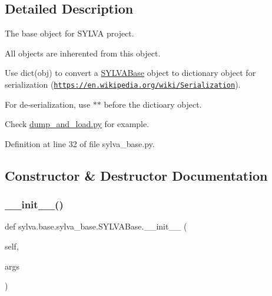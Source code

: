 \subsection{Detailed Description}
The base object for S\+Y\+L\+VA project. 

All objects are inherented from this object.


\begin{DoxyItemize}
\item Use {\ttfamily dict(obj)} to convert a \hyperlink{classsylva_1_1base_1_1sylva__base_1_1_s_y_l_v_a_base}{S\+Y\+L\+V\+A\+Base} object to dictionary object for serialization (\href{https://en.wikipedia.org/wiki/Serialization}{\tt https\+://en.\+wikipedia.\+org/wiki/\+Serialization}).
\item For de-\/serialization, use {\ttfamily $\ast$$\ast$} before the dictioary object.
\end{DoxyItemize}

Check \hyperlink{dump_and_load_8py-example}{dump\+\_\+and\+\_\+load.\+py} for example. 

Definition at line 32 of file sylva\+\_\+base.\+py.



\subsection{Constructor \& Destructor Documentation}
\mbox{\label{classsylva_1_1base_1_1sylva__base_1_1_s_y_l_v_a_base_adb3747bc0503b669cbc05e7419adb454}} 
\subsubsection{\texorpdfstring{\+\_\+\+\_\+init\+\_\+\+\_\+()}{\_\_init\_\_()}}
{\footnotesize\ttfamily def sylva.\+base.\+sylva\+\_\+base.\+S\+Y\+L\+V\+A\+Base.\+\_\+\+\_\+init\+\_\+\+\_\+ (\begin{DoxyParamCaption}\item[{}]{self,  }\item[{}]{args }\end{DoxyParamCaption})}



